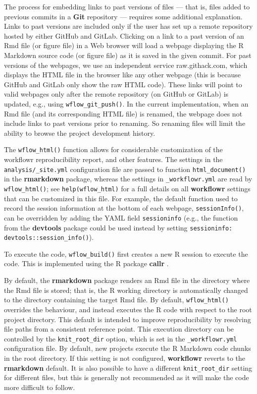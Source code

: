 \documentclass[9pt,a4paper]{extarticle}
\begin{document}
The process for embedding links to past versions of files --- that is,
files added to previous commits in a \textbf{Git} repository --- requires some
additional explanation. Links to past versions are included only if the
user has set up a remote repository hosted by either GitHub and GitLab.
Clicking on a link to a past version of an Rmd file (or figure file) in
a Web browser will load a webpage displaying the R Markdown source code
(or figure file) as it is saved in the given commit. For past versions
of the webpages, we use an independent service raw.githack.com, which
displays the HTML file in the browser like any other webpage (this is
because GitHub and GitLab only show the raw HTML code). These links will
point to valid webpages only after the remote repository (on GitHub or
GitLab) is updated, e.g., using \texttt{wflow\_git\_push()}. In the current
implementation, when an Rmd file (and its corresponding HTML file) is
renamed, the webpage does not include links to past versions prior to
renaming. So renaming files will limit the ability to browse the project
development history.

The \texttt{wflow\_html()} function allows for considerable customization of the
workflowr reproducibility report, and other features. The settings in
the \verb|analysis/_site.yml| configuration file are passed to function
\texttt{html\_document()} in the \textbf{rmarkdown} package, whereas the settings in
\verb|_workflowr.yml| are read by \texttt{wflow\_html()}; see
\texttt{help(wflow\_html)} for a full details on all \textbf{workflowr} settings
that can be customized in this file. For example, the default function
used to record the session information at the bottom of each webpage,
\texttt{sessionInfo()}, can be overridden by adding the YAML field
\verb|sessioninfo| (e.g., the function from the \textbf{devtools} \cite{devtools}
package could be used instead by setting \texttt{sessioninfo:
devtools::session\_info()}).

To execute the code, \texttt{wflow\_build()} first creates a new R session to
execute the code. This is implemented using the R package \textbf{callr}
\cite{callr}.

By default, the \textbf{rmarkdown} package renders an Rmd file in the directory
where the Rmd file is stored; that is, the R working directory is
automatically changed to the directory containing the target Rmd file.
By default, \texttt{wflow\_html()} overrides the behaviour, and instead executes
the R code with respect to the root project directory. This default is
intended to improve reproducibility by resolving file paths from a
consistent reference point. This execution directory can be controlled
by the \verb|knit_root_dir| option, which is set in the 
\texttt{\_workflowr.yml} configuration file. By default, new projects execute the
R Markdown code chunks in the root directory. If this setting is not
configured, \textbf{workflowr} reverts to the \textbf{rmarkdown} default. It is also
possible to have a different \texttt{knit\_root\_dir} setting for
different files, but this is generally not recommended as it will make
the code more difficult to follow.
\end{document}
